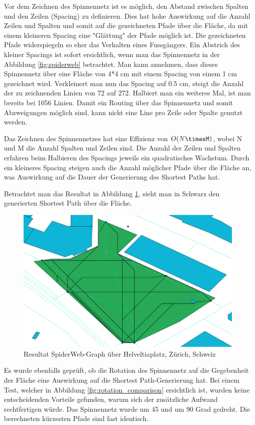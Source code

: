 Vor dem Zeichnen des Spinnennetz ist es möglich, den Abstand zwischen Spalten und den Zeilen (Spacing) zu definieren. Dies hat hohe Auswirkung auf die Anzahl Zeilen und Spalten und somit auf die gezeichneten Pfade über die Fläche, da mit einem kleineren Spacing eine "Glättung" der Pfade möglich ist. Die gezeichneten Pfade widerspiegeln so eher das Verhalten eines Fussgängers. Ein Abstrich des kleiner Spacings ist sofort ersichtlich, wenn man das Spinnennetz in der Abbildung \ref{fig:spiderweb} betrachtet. Man kann annehmen, dass dieses Spinnennetz über eine Fläche von 4*4 cm mit einem Spacing von einem 1 cm gezeichnet wird. Verkleinert man nun das Spacing auf 0.5 cm, steigt die Anzahl der zu zeichnenden Linien von 72 auf 272. Halbiert man ein weiteres Mal, ist man bereits bei 1056 Linien. Damit ein Routing über das Spinnennetz und somit Abzweigungen möglich sind, kann nicht eine Line pro Zeile oder Spalte genutzt werden.

Das Zeichnen des Spinnennetzes hat eine Effizienz von $O(N\timesM)$, wobei N und M die Anzahl Spalten und Zeilen sind. Die Anzahl der Zeilen und Spalten erfahren beim Halbieren des Spacings jeweils ein quadratisches Wachstum. Durch ein kleineres Spacing steigen auch die Anzahl möglicher Pfade über die Fläche an, was Auswirkung auf die Dauer der Generierung des Shortest Paths hat. 

Betrachtet man das Resultat in Abbildung \ref{fig:spiderweb_result}, sieht man in Schwarz den generierten Shortest Path über die Fläche.

\begin{figure}[th]
\centering
\includegraphics[width=0.7\linewidth]{technicalreport/img/spiderweb_result}
\caption[Resultat SpiderWeb-Graph]{Resultat SpiderWeb-Graph über Helveltiaplatz, Zürich, Schweiz}
\label{fig:spiderweb_result}
\end{figure}


Es wurde ebenfalls geprüft, ob die Rotation des Spinnennetz auf die Gegebenheit der Fläche eine Auswirkung auf die Shortest Path-Generierung hat. Bei einem Test, welcher in Abbildung \ref{fig:rotation_comparison} ersichtlich ist, wurden keine entscheidenden Vorteile gefunden, warum sich der zusätzliche Aufwand rechtfertigen würde. Das Spinnennetz wurde um 45 und um 90 Grad gedreht. Die berechneten kürzesten Pfade sind fast identisch.

